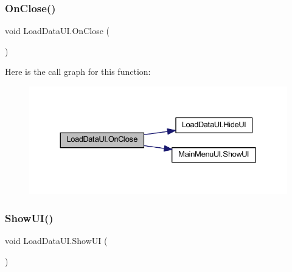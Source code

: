 \subsubsection{\texorpdfstring{OnClose()}{OnClose()}}
{\footnotesize\ttfamily void Load\+Data\+U\+I.\+On\+Close (\begin{DoxyParamCaption}{ }\end{DoxyParamCaption})}

Here is the call graph for this function\+:
\nopagebreak
\begin{figure}[H]
\begin{center}
\leavevmode
\includegraphics[width=330pt]{class_load_data_u_i_a5d74ebc8dc0756974c13087df72872f0_cgraph}
\end{center}
\end{figure}
\mbox{\label{class_load_data_u_i_ac0ab99a18f93b2092d30e1ecea86154d}} 
\subsubsection{\texorpdfstring{ShowUI()}{ShowUI()}}
{\footnotesize\ttfamily void Load\+Data\+U\+I.\+Show\+UI (\begin{DoxyParamCaption}{ }\end{DoxyParamCaption})}

